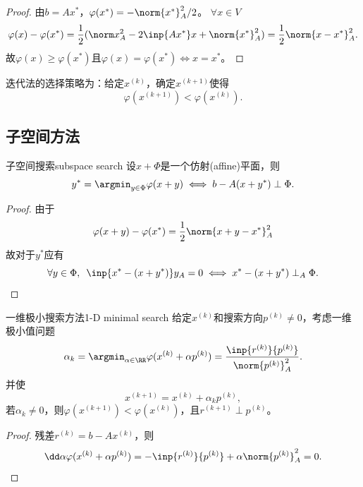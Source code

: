 \begin{proof}
    由$b=Ax^*$，$\varphi(x^*)=-\norm{x^*}_A^2/2$。
    $\forall x\in V$
    \[
        \varphi(x)-\varphi(x^*)=\frac12(\norm x_A^2-2\inp{Ax^*}x+\norm{x^*}_A^2)=\frac12\norm{x-x^*}^2_A.
    \]
    故$\varphi(x)\geq\varphi(x^*)$且$\varphi(x)=\varphi(x^*)\iff x=x^*$。
\end{proof}

\begin{corollary}
    迭代法的选择策略为：给定$x^{(k)}$，确定$x^{(k+1)}$使得
    \[
        \varphi(x^{(k+1)})<\varphi(x^{(k)}).
    \]
\end{corollary}

\subsection{子空间方法}
\label{ssec:subspace method}

\begin{theorem}
    {子空间搜索}{subspace search}
    设$x+\Phi$是一个仿射(affine)平面，则
    \[
        y^*=\argmin_{y\in\Phi}\varphi(x+y)\iff
        b-A(x+y^*)\perp\Phi.
    \]
\end{theorem}

\begin{proof}
    由于
    \[
        \varphi(x+y)-\varphi(x^*)=\frac12\norm{x+y-x^*}_A^2
    \]
    故对于$y^*$应有
    \[
        \forall y\in\Phi,\enspace\inp{x^*-(x+y^*)}y_A=0\iff
        x^*-(x+y^*)\perp_A\Phi.
        \qedhere
    \]
\end{proof}

\begin{theorem}
    {一维极小搜索方法}{1-D minimal search}
    给定$x^{(k)}$和搜索方向$p^{(k)}\neq 0$，考虑一维极小值问题
    \begin{equation}
        \label{eqn:alphak}
        \alpha_k=\argmin_{\alpha\in\RR}\varphi(x^{(k)}+\alpha p^{(k)})=\frac{\inp{r^{(k)}}{p^{(k)}}}{\norm{p^{(k)}}_A^2}.
    \end{equation}
    并使
    \begin{equation}
        x^{(k+1)}=x^{(k)}+\alpha_kp^{(k)},
    \end{equation}
    若$\alpha_k\neq 0$，则$\varphi(x^{(k+1)})<\varphi(x^{(k)})$，且$r^{(k+1)}\perp p^{(k)}$。
\end{theorem}

\begin{proof}
    残差$r^{(k)}=b-Ax^{(k)}$，则
    \[
        \dd\alpha\varphi(x^{(k)}+\alpha p^{(k)})=-\inp{r^{(k)}}{p^{(k)}}+\alpha\norm{p^{(k)}}_A^2=0.
        \qedhere
    \]
\end{proof}

